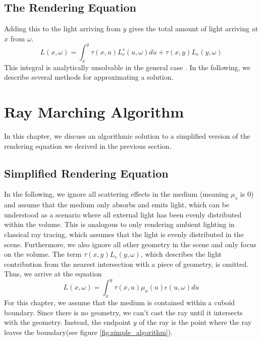 \subsection{The Rendering Equation}
Adding this to the light arriving from ${y}$ gives the total amount of light arriving at ${x}$ from $\omega $.
\begin{equation}
L({x}, \omega ) = {\int_{{x}}^{{y}} \tau({x}, {u})L_e^s({u}, \omega )d{u}} + \tau({x}, {y}) L_e({y}, \omega )
\end{equation}
This integral is analytically unsolvable in the general case \cite{10.1145/964965.808594}.
In the following, we describe several methods for approximating a solution.











\section{Ray Marching Algorithm}
\label{sec:ray_marching}
In this chapter, we discuss an algorithmic solution\cite{511, 10.1145/147130.147155} to a simplified version of the rendering equation we derived in the previous section.
\subsection{Simplified Rendering Equation}
In the following, we ignore all scattering effects in the medium (meaning $\mu_s $ is 0) and assume that the medium only absorbs and emits light\cite{10.1145/147130.147155}, which can be understood as a scenario where all external light has been evenly distributed within the volume. This is analogous to only rendering ambient lighting in classical ray tracing, which assumes that the light is evenly distributed in the scene.
Furthermore, we also ignore all other geometry in the scene and only focus on the volume. The term $\tau({x}, {y}) L_e({y}, \omega )$, which describes the light contribution from the nearest intersection with a piece of geometry, is omitted.
Thus, we arrive at the equation
\begin{equation} \label{eq:simplified_req}
L({x}, \omega ) = \int_{{x}}^{{y}} \tau({x}, {u}){\mu}_a({u})\epsilon ({u}, \omega)d{u}
\end{equation}
For this chapter, we assume that the medium is contained within a cuboid boundary\cite{10.1145/147130.147155, 10.1145/78964.78965}. Since there is no geometry, we can't cast the ray until it intersects with the geometry. Instead, the endpoint ${y}$ of the ray is the point where the ray leaves the boundary(see figure \ref{fig:simple_algorithm}).

